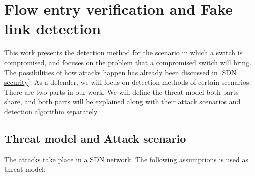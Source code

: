 \chapter{Flow entry verification and Fake link detection}
This work presents the detection method for the scenario in which a switch is compromised, and focuses on the problem that a compromised switch will bring. The possibilities of how attacks happen has already been discussed in \ref{SDN security}. As a defender, we will focus on detection methods of certain scenarios. There are two parts in our work. We will define the threat model both parts share, and both parts will be explained along with their attack scenarios and detection algorithm separately.

\section{Threat model and Attack scenario}
The attacks take place in a SDN network. The following assumptions is used as threat model:
